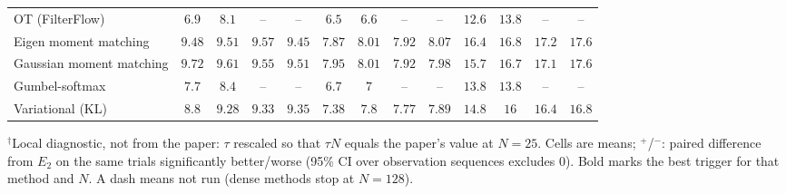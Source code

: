 \begin{table}[ht]
\begin{adjustbox}{max width=\linewidth}
\begin{tabular}{lcccc|cccc|cccc}
OT (FilterFlow) & $6.9$ & $8.1$ & -- & -- & $6.5$ & $6.6$ & -- & -- & $12.6$ & $13.8$ & -- & -- \\
Eigen moment matching & $9.48$ & $9.51$ & $9.57$ & $9.45$ & $7.87$ & $8.01$ & $7.92$ & $8.07$ & $16.4$ & $16.8$ & $17.2$ & $17.6$ \\
Gaussian moment matching & $9.72$ & $9.61$ & $9.55$ & $9.51$ & $7.95$ & $8.01$ & $7.92$ & $7.98$ & $15.7$ & $16.7$ & $17.1$ & $17.6$ \\
Gumbel-softmax & $7.7$ & $8.4$ & -- & -- & $6.7$ & $7$ & -- & -- & $13.8$ & $13.8$ & -- & -- \\
Variational (KL) & $8.8$ & $9.28$ & $9.33$ & $9.35$ & $7.38$ & $7.8$ & $7.77$ & $7.89$ & $14.8$ & $16$ & $16.4$ & $16.8$ \\
\bottomrule
\end{tabular}
\end{adjustbox}
\par\smallskip\parbox{0.95\linewidth}{\footnotesize $^\dagger$Local diagnostic, not from the paper: $\tau$ rescaled so that $\tau N$ equals the paper's value at $N{=}25$. Cells are means; $^{+}$/$^{-}$: paired difference from $E_2$ on the same trials significantly better/worse (95\% CI over observation sequences excludes 0). Bold marks the best trigger for that method and $N$. A dash means not run (dense methods stop at $N{=}128$).}
\end{table}

